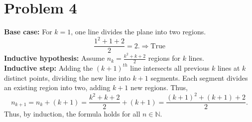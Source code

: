 \documentclass[twoside]{article}
\begin{document}
\newpage

\section*{Problem 4}
\textbf{Base case:} For \(k=1\), one line divides the plane into two regions. \[\frac{1^2+1+2}{2}=2. \Rightarrow \text{True}\]
\textbf{Inductive hypothesis:} Assume \(n_k=\tfrac{k^2+k+2}{2}\) regions for \(k\) lines. \\
\textbf{Inductive step:} Adding the \((k+1)^{th}\) line intersects all previous \(k\) lines at \(k\) distinct points, dividing the new line into \(k+1\) segments. Each segment divides an existing region into two, adding \(k+1\) new regions. Thus,
\[n_{k+1}=n_k+(k+1)=\frac{k^2+k+2}{2}+(k+1)=\frac{(k+1)^2+(k+1)+2}{2}.\] 
Thus, by induction, the formula holds for all \(n\in\mathbb{N}\).
\end{document}
